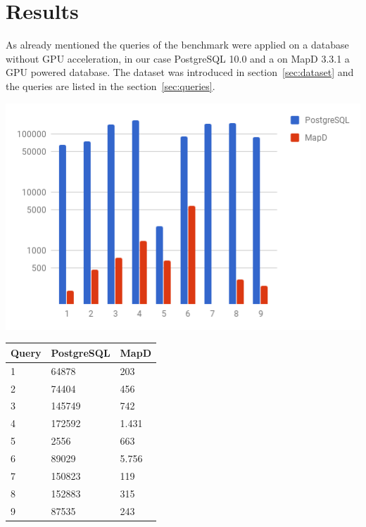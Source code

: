 \newpage
\section{Results}
As already mentioned the queries of the benchmark were applied on a database without GPU acceleration,
in our case PostgreSQL 10.0 and a on MapD 3.3.1 a GPU powered database.
The dataset was introduced in section~\ref{sec:dataset} and the queries are listed in the section~\ref{sec:queries}.


\begin{minipage}{\textwidth}
  \begin{minipage}[b]{0.6\textwidth}
    \centering
     \includegraphics[width=1.0\textwidth,height=1.0\textheight,keepaspectratio]{images/cold_postgres_vs_mapd.png}
    \label{fig:cold_postgres_vs_mapd}
  \end{minipage}
  \hfill
  \begin{minipage}[b]{0.4\textwidth}
    \centering
  \begin{tabular}{ |l|l|l| }
    \hline
    Query & PostgreSQL & MapD \\
    \hline
    1 & 64878 & 203 \\
    2 & 74404 & 456 \\
    3 & 145749 & 742 \\
    4 & 172592 & 1.431 \\
    5 & 2556 & 663 \\
    6 & 89029 & 5.756 \\
    7 & 150823 & 119 \\
    8 & 152883 & 315 \\
    9 & 87535 & 243 \\
    \hline
\end{tabular}
            \label{tab:cold_postgres_vs_mapd}
    \end{minipage}
 \end{minipage}



